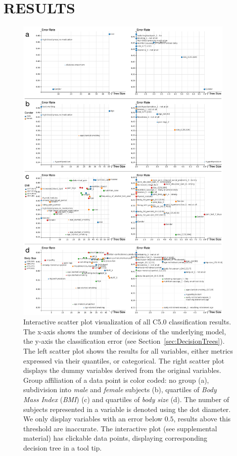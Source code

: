 \documentclass[a4paper,twoside]{style/article}
\begin{document}
\section{\uppercase{Results}}
\begin{figure}[p!]
  \centering
  \includegraphics[width=0.95\textwidth]{figures/results}
  \caption{
Interactive scatter plot visualization of all C5.0 classification results.
The x-axis shows the number of decisions of the underlying model, the y-axis the classification error (see Section~\ref{sec:DecisionTrees}).
The left scatter plot shows the results for all variables, either metrics expressed via their quantiles, or categorical.
The right scatter plot displays the dummy variables derived from the original variables.
Group affiliation of a data point is color coded:
no group (a), subdivision into \emph{male} and \emph{female} subjects (b), quartiles of \emph{Body Mass Index} (\emph{BMI}) (c) and quartiles of \emph{body size} (d).
The number of subjects represented in a variable is denoted using the dot diameter.
We only display variables with an error below $0.5$, results above this threshold are inaccurate.
The interactive plot (see supplemental material) has clickable data points, displaying corresponding decision tree in a tool tip.
}
  \label{fig:results}
\end{figure}
\end{document}
